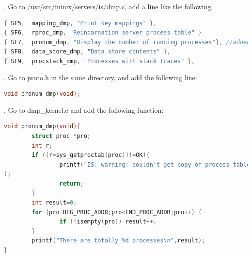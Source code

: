 \documentclass{article}
\begin{document}
\begin{itemize}
{. Go to {\color{blue} /usr/src/minix/servers/is/dmp.c}, add a line like the following. }

\begin{lstlisting}[language=C]
{ SF5,  mapping_dmp, "Print key mappings" },
{ SF6,  rproc_dmp, "Reincarnation server process table" }
{ SF7,  pronum_dmp, "Display the number of running processes"}, //added 
{ SF8,  data_store_dmp, "Data store contents" },
{ SF9,  procstack_dmp, "Processes with stack traces" },
\end{lstlisting}

{. Go to {\color{blue} proto.h} in the same directory, and add the following line:}

\begin{lstlisting}[language=C]
void pronum_dmp(void);
\end{lstlisting}

{. Go to {\color{blue} dmp\_kernel.c} and add the following function:}

\begin{lstlisting}[language=C]
void pronum_dmp(void){
        struct proc *pro;
        int r;
        if ((r=sys_getproctab(proc))!=OK){
                printf("IS: warning: couldn't get copy of process table: %d\n",r
);
                return;
        }
        int result=0;
        for (pro=BEG_PROC_ADDR;pro<END_PROC_ADDR;pro++) {
                if (!isempty(pro)) result++;
        }
        printf("There are totally %d processes\n",result);
}
\end{lstlisting}


\end{itemize}
\end{document}
